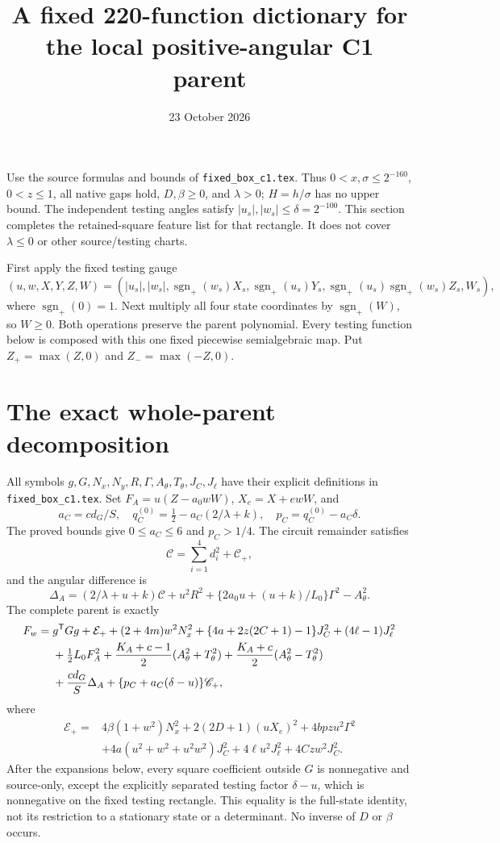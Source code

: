 \documentclass[11pt]{article}
\title{A fixed 220-function dictionary for the local positive-angular C1 parent}
\author{}\date{23 October 2026}
\begin{document}
\maketitle

Use the source formulas and bounds of \texttt{fixed\_box\_c1.tex}.
Thus $0<x,\sigma\le2^{-160}$, $0<z\le1$, all native gaps hold,
$D,\beta\ge0$, and $\lambda>0$; $H=h/\sigma$ has no upper bound.
The independent testing angles satisfy $|u_s|,|w_s|\le\delta=2^{-100}$.
This section completes the retained-square feature list for that
rectangle. It does not cover $\lambda\le0$ or other source/testing
charts.

First apply the fixed testing gauge
\[
 (u,w,X,Y,Z,W)=(|u_s|,|w_s|,
       \operatorname{sgn}_+(w_s)X_s,\operatorname{sgn}_+(u_s)Y_s,
       \operatorname{sgn}_+(u_s)\operatorname{sgn}_+(w_s)Z_s,W_s),
\]
where $\operatorname{sgn}_+(0)=1$. Next multiply all four state
coordinates by $\operatorname{sgn}_+(W)$, so $W\ge0$.
Both operations preserve the parent polynomial. Every testing
function below is composed with this one fixed piecewise
semialgebraic map. Put $Z_+=\max(Z,0)$ and $Z_-=\max(-Z,0)$.

\section{The exact whole-parent decomposition}

All symbols $g,G,N_x,N_y,R,\Gamma,A_\theta,T_\theta,J_C,J_\ell$
have their explicit definitions in \texttt{fixed\_box\_c1.tex}.
Set $F_A=u(Z-a_0wW)$, $X_e=X+ewW$, and
\[
 a_C=cd_G/S,\quad q_C^{(0)}=\tfrac12-a_C(2/\lambda+k),\quad
 p_C=q_C^{(0)}-a_C\delta.
\]
The proved bounds give $0\le a_C\le6$ and $p_C>1/4$.
The circuit remainder satisfies
\[
 \mathscr C=\sum_{i=1}^4d_i^2+\mathscr C_+,
\]
and the angular difference is
\[
 \Delta_A=(2/\lambda+u+k)\mathscr C+u^2R^2
       +\{2a_0u+(u+k)/L_0\}\Gamma^2-A_\theta^2.
\]
The complete parent is exactly
\begin{align*}
 F_w={}&g^{\mathsf T}Gg+\mathcal E_+
 +(2+4m)w^2N_x^2
 +\{4a+2z(2C+1)-1\}J_C^2+(4\ell-1)J_\ell^2\\
 &+\tfrac12L_0F_A^2
 +{K_A+c-1\over2}(A_\theta^2+T_\theta^2)
 +{K_A+c\over2}(A_\theta^2-T_\theta^2)\\
 &+{cd_G\over S}\Delta_A
 +\{p_C+a_C(\delta-u)\}\mathscr C_+,
\end{align*}
where
\[
\begin{split}
 \mathcal E_+={}&4\beta(1+w^2)N_x^2+2(2D+1)(uX_e)^2
                 +4bpzu^2\Gamma^2\\
 &+4a(u^2+w^2+u^2w^2)J_C^2+4\ell u^2J_\ell^2
                                             +4Czw^2J_C^2.
\end{split}
\]
After the expansions below, every square coefficient outside $G$
is nonnegative and source-only, except the explicitly separated
testing factor $\delta-u$, which is nonnegative on the fixed
testing rectangle. This equality
is the full-state identity, not its restriction to a stationary
state or a determinant. No inverse of $D$ or $\beta$ occurs.
\end{document}
